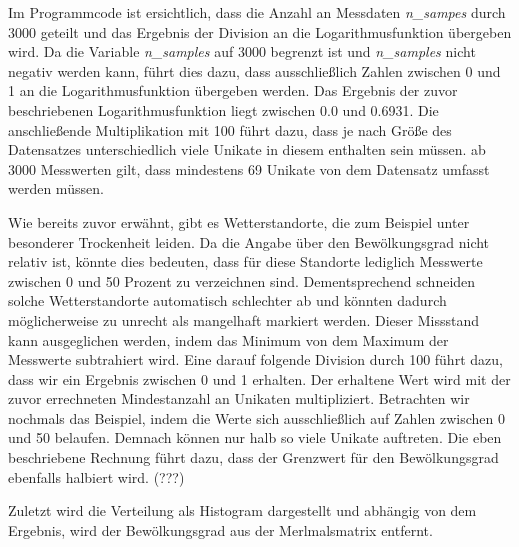 \documentclass[12pt, a4paper]{article}
\begin{document}
Im Programmcode ist ersichtlich, dass die Anzahl an Messdaten \textit{n\_sampes} durch 3000 geteilt und das Ergebnis der Division an die Logarithmusfunktion übergeben wird. Da die Variable \textit{n\_samples} auf 3000 begrenzt ist und \textit{n\_samples} nicht negativ werden kann, führt dies dazu, dass ausschließlich Zahlen zwischen 0 und 1 an die Logarithmusfunktion übergeben werden. Das Ergebnis der zuvor beschriebenen Logarithmusfunktion liegt zwischen 0.0 und 0.6931. Die anschließende Multiplikation mit 100 führt dazu, dass je nach Größe des Datensatzes unterschiedlich viele Unikate in diesem enthalten sein müssen. ab 3000 Messwerten gilt, dass mindestens 69 Unikate von dem Datensatz umfasst werden müssen.

Wie bereits zuvor erwähnt, gibt es Wetterstandorte, die zum Beispiel unter besonderer Trockenheit leiden. Da die Angabe über den Bewölkungsgrad nicht relativ ist, könnte dies bedeuten, dass für diese Standorte lediglich Messwerte zwischen 0 und 50 Prozent zu verzeichnen sind. Dementsprechend schneiden solche Wetterstandorte automatisch schlechter ab und könnten dadurch möglicherweise zu unrecht als mangelhaft markiert werden. Dieser Missstand kann ausgeglichen werden, indem das Minimum von dem Maximum der Messwerte subtrahiert wird. Eine darauf folgende Division durch 100 führt dazu, dass wir ein Ergebnis zwischen 0 und 1 erhalten. Der erhaltene Wert wird mit der zuvor errechneten Mindestanzahl an Unikaten multipliziert. Betrachten wir nochmals das Beispiel, indem die Werte sich ausschließlich auf Zahlen zwischen 0 und 50 belaufen. Demnach können nur halb so viele Unikate auftreten. Die eben beschriebene Rechnung führt dazu, dass der Grenzwert für den Bewölkungsgrad ebenfalls halbiert wird. (???)

Zuletzt wird die Verteilung als Histogram dargestellt und abhängig von dem Ergebnis, wird der Bewölkungsgrad aus der Merlmalsmatrix entfernt.
\end{document}
